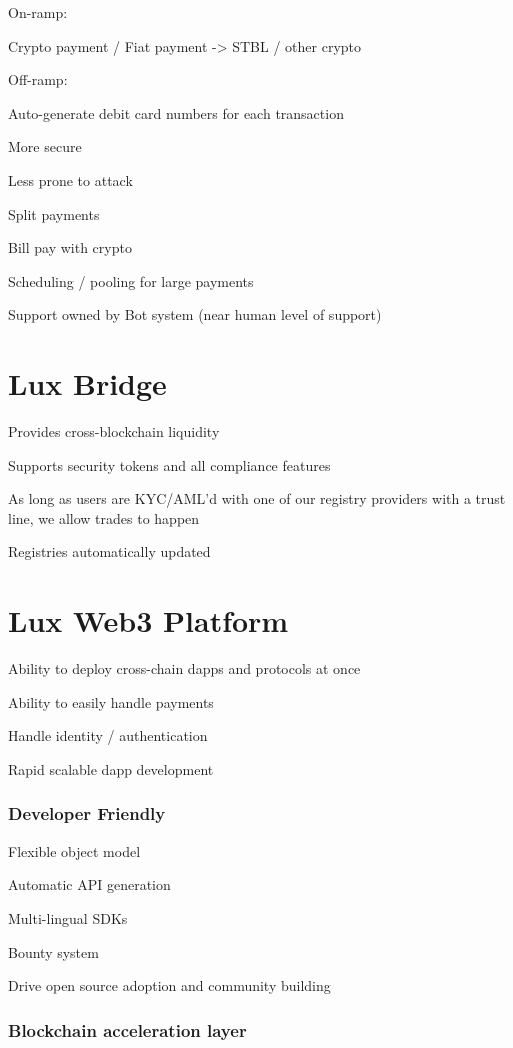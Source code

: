 \documentclass[11pt]{article}
\begin{document}
On-ramp:


Crypto payment / Fiat payment -> STBL / other crypto


Off-ramp:


Auto-generate debit card numbers for each transaction


More secure


Less prone to attack


Split payments


Bill pay with crypto


Scheduling / pooling for large payments


Support owned by Bot system (near human level of support)


\section{Lux Bridge}

Provides cross-blockchain liquidity


Supports security tokens and all compliance features


As long as users are KYC/AML'd with one of our registry providers with a trust line, we allow trades to happen


Registries automatically updated


\section{Lux Web3 Platform}

Ability to deploy cross-chain dapps and protocols at once


Ability to easily handle payments


Handle identity / authentication


Rapid scalable dapp development


\subsubsection{Developer Friendly}

Flexible object model


Automatic API generation


Multi-lingual SDKs


Bounty system


Drive open source adoption and community building


\subsubsection{Blockchain acceleration layer}
\end{document}
